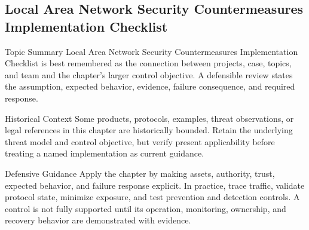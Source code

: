 \documentclass[11pt,letterpaper]{article}
\begin{document}
\subsection*{Local Area Network Security Countermeasures Implementation Checklist}
\begin{CornellNotesTable}
\end{CornellNotesTable}
\begin{CornellSummaryBox}{Topic Summary}
Local Area Network Security Countermeasures Implementation Checklist is best remembered as the connection between projects, case, topics, and team and the chapter's larger control objective. A defensible review states the assumption, expected behavior, evidence, failure consequence, and required response.
\end{CornellSummaryBox}
\begin{CornellWarningBox}{Historical Context}
Some products, protocols, examples, threat observations, or legal references in this chapter are historically bounded. Retain the underlying threat model and control objective, but verify present applicability before treating a named implementation as current guidance.
\end{CornellWarningBox}
\begin{CornellOverviewBox}{Defensive Guidance}
Apply the chapter by making assets, authority, trust, expected behavior, and failure response explicit. In practice, trace traffic, validate protocol state, minimize exposure, and test prevention and detection controls. A control is not fully supported until its operation, monitoring, ownership, and recovery behavior are demonstrated with evidence.
\end{CornellOverviewBox}
\end{document}
